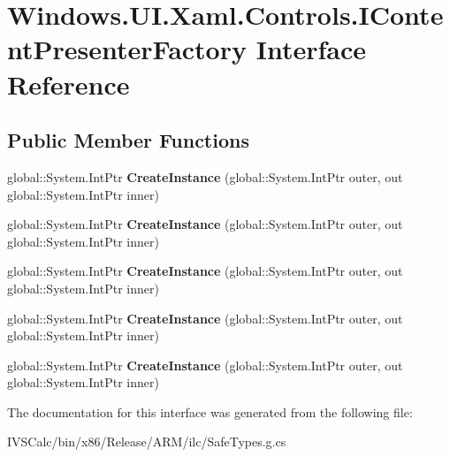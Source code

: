 \hypertarget{interface_windows_1_1_u_i_1_1_xaml_1_1_controls_1_1_i_content_presenter_factory}{}\section{Windows.\+U\+I.\+Xaml.\+Controls.\+I\+Content\+Presenter\+Factory Interface Reference}
\label{interface_windows_1_1_u_i_1_1_xaml_1_1_controls_1_1_i_content_presenter_factory}
\subsection*{Public Member Functions}
\begin{DoxyCompactItemize}
\item 
\mbox{\label{interface_windows_1_1_u_i_1_1_xaml_1_1_controls_1_1_i_content_presenter_factory_a100e6e91ee161e56e56afa19da5fb593}} 
global\+::\+System.\+Int\+Ptr {\bfseries Create\+Instance} (global\+::\+System.\+Int\+Ptr outer, out global\+::\+System.\+Int\+Ptr inner)
\item 
\mbox{\label{interface_windows_1_1_u_i_1_1_xaml_1_1_controls_1_1_i_content_presenter_factory_a100e6e91ee161e56e56afa19da5fb593}} 
global\+::\+System.\+Int\+Ptr {\bfseries Create\+Instance} (global\+::\+System.\+Int\+Ptr outer, out global\+::\+System.\+Int\+Ptr inner)
\item 
\mbox{\label{interface_windows_1_1_u_i_1_1_xaml_1_1_controls_1_1_i_content_presenter_factory_a100e6e91ee161e56e56afa19da5fb593}} 
global\+::\+System.\+Int\+Ptr {\bfseries Create\+Instance} (global\+::\+System.\+Int\+Ptr outer, out global\+::\+System.\+Int\+Ptr inner)
\item 
\mbox{\label{interface_windows_1_1_u_i_1_1_xaml_1_1_controls_1_1_i_content_presenter_factory_a100e6e91ee161e56e56afa19da5fb593}} 
global\+::\+System.\+Int\+Ptr {\bfseries Create\+Instance} (global\+::\+System.\+Int\+Ptr outer, out global\+::\+System.\+Int\+Ptr inner)
\item 
\mbox{\label{interface_windows_1_1_u_i_1_1_xaml_1_1_controls_1_1_i_content_presenter_factory_a100e6e91ee161e56e56afa19da5fb593}} 
global\+::\+System.\+Int\+Ptr {\bfseries Create\+Instance} (global\+::\+System.\+Int\+Ptr outer, out global\+::\+System.\+Int\+Ptr inner)
\end{DoxyCompactItemize}


The documentation for this interface was generated from the following file\+:\begin{DoxyCompactItemize}
\item 
I\+V\+S\+Calc/bin/x86/\+Release/\+A\+R\+M/ilc/Safe\+Types.\+g.\+cs\end{DoxyCompactItemize}
